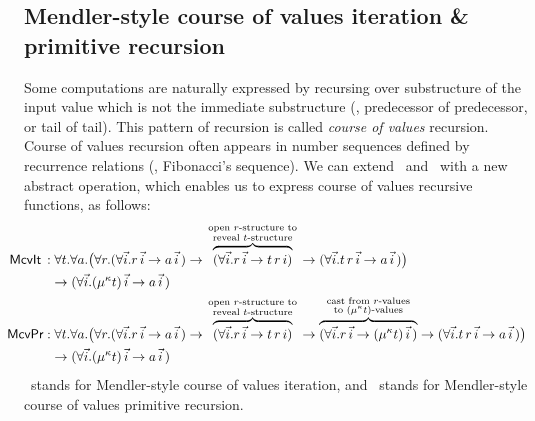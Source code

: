 \subsection{Mendler-style course of values iteration \& primitive recursion}
\label{sec:mendler:cv}
Some computations are naturally expressed by recursing over substructure
of the input value which is not the immediate substructure (\eg, predecessor
of predecessor, or tail of tail). This pattern of recursion is called
\emph{course of values} recursion. Course of values recursion often appears
in number sequences defined by recurrence relations (\eg, Fibonacci's sequence).
We can extend \MIt\ and \MPr\ with a new abstract operation, which enables
us to express course of values recursive functions, as follows:
\begin{align*}
\!\!\!\!\!\!\!\!
 \McvIt\, :&\; \forall t . \forall a .
   \big( \forall r .
         (\forall\vec{i} . r\,\vec{i} -> a\,\vec{i}\,)
   -> \overbraceset{\begin{smallmatrix}
                     \text{open $r$-structure to} \\
                     \text{reveal $t$-structure} \\
                    \end{smallmatrix}}{
         (\forall\vec{i} . r\,\vec{i} -> t\,r\, i) }
   ->    (\forall\vec{i} . t\, r\,\vec{i} -> a\,\vec{i}\,)
   \big) \\
& -> (\forall\vec{i} . (\mu^\kappa t)\,\vec{i} -> a\,\vec{i}\,) \\
\!\!\!\!\!\!\!\!
 \McvPr :&\; \forall t . \forall a .
   \big( \forall r .   
         (\forall\vec{i} . r\,\vec{i} -> a\,\vec{i}\,)
   -> \overbraceset{\begin{smallmatrix}
                     \text{open $r$-structure to} \\
                     \text{reveal $t$-structure} \\
                    \end{smallmatrix}}{
         (\forall\vec{i} . r\,\vec{i} -> t\,r\,i) }
   -> \overbraceset{\begin{smallmatrix}
                     \text{cast from $r$-values} \\
                     \text{to $(\mu^\kappa t)$-values} \\
                    \end{smallmatrix}}{
         (\forall\vec{i} . r\,\vec{i} -> (\mu^\kappa t)\,\vec{i}\,) }
   ->    (\forall\vec{i} . t\, r\,\vec{i} -> a\,\vec{i}\,)
   \big)\\ 
& -> (\forall\vec{i} . (\mu^\kappa t)\,\vec{i} -> a\,\vec{i}\,)
\end{align*}
\McvIt\ stands for Mendler-style course of values iteration,
and \McvPr\ stands for Mendler-style course of values primitive recursion.

